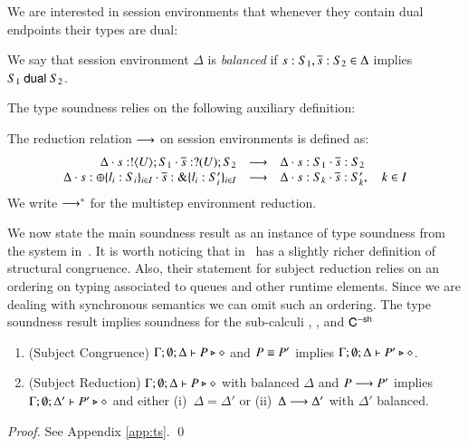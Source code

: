We are interested in session environments that whenever they contain dual endpoints
their types are dual:
%
\begin{definition}\label{d:wtenv}\rm
	We say that session environment $\Delta$ is {\em balanced} if
	$s: S_1, \overline{s}: S_2 \in \Delta$ implies $S_1 \ \mathsf{dual}\  S_2$.
\end{definition}
%
The type soundness relies on the following auxiliary definition:
%
\begin{definition}\rm
	\label{def:ses_red}
	The reduction relation $\longrightarrow$ on session environments is defined as:
%
\[
	\begin{array}{rcl}
		\Delta \cdot s: ! \langle U \rangle ; S_1 \cdot \overline{s}: ? (U) ; S_2 &\longrightarrow& \Delta \cdot s: S_1 \cdot \overline{s}: S_2
		\\
		\Delta \cdot s: \oplus \{l_i: S_i\}_{i \in I} \cdot \overline{s}: \& \{l_i: S_i'\}_{i \in I} &\longrightarrow& \Delta \cdot s: S_k \cdot \overline{s}: S_k', \quad k \in I
	\end{array}
\]
%
	We write $\longrightarrow^\ast$ for the multistep environment reduction.
\end{definition}
%
We now state the main soundness result as an instance
of type soundness from the system in~\cite{tlca07}.
It is worth noticing that in~\cite{tlca07} has a slightly richer
definition of structural congruence.
Also, their statement for subject reduction relies on an
ordering on typing associated to queues and other 
runtime elements. %
Since we are dealing with synchronous semantics we can omit such an ordering.
The type soundness result implies soundness for the sub-calculi
\HO, \sessp, and $\mathsf{C}^{\mathsf{-sh}}$

\begin{theorem}\rm
	\label{thm:sr}
%
	\begin{enumerate}[1.]
		\item	(Subject Congruence)
			$\Gamma; \emptyset; \Delta \vdash P \triangleright \diamond$
			and
			$P \equiv P'$
			implies
			$\Gamma; \emptyset; \Delta \vdash P' \triangleright \diamond$.

		\item	(Subject Reduction)
			$\Gamma; \emptyset; \Delta \vdash P \triangleright \diamond$
			with
			balanced $\Delta$
			and
			$P \longrightarrow P'$
			implies $\Gamma; \emptyset; \Delta'  \vdash P' \triangleright \diamond$
			and either (i)~$\Delta = \Delta'$ or (ii)~$\Delta \longrightarrow \Delta'$
			with $\Delta'$ balanced.
	\end{enumerate}
\end{theorem}

\begin{proof}
	See Appendix \ref{app:ts}.
	\qed
\end{proof}
